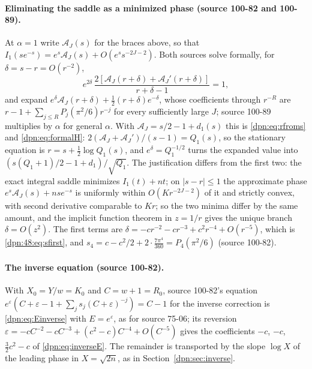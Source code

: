 \documentclass[11pt]{article}
\numberwithin{equation}{section}
\theoremstyle{definition}\newtheorem{definition}[theorem]{Definition}
\theoremstyle{remark}\newtheorem{remark}[theorem]{Remark}
\newcommand{\src}[1]{\textup{(source #1)}}
\begin{document}
\paragraph{Eliminating the saddle as a minimized phase \src{100-82 and 100-89}.}
At $\alpha=1$ write $\mathcal A_J(s)$ for the braces above, so that
$I_1(se^{-s})=e^s\mathcal A_J(s)+O(e^ss^{-2J-2})$.  Both sources solve
formally, for $\delta=s-r=O(r^{-2})$,
\[
 e^{2\delta}\,\frac{2[\mathcal A_J(r+\delta)+\mathcal A_J'(r+\delta)]}{r+\delta-1}=1,
\]
and expand $e^\delta\mathcal A_J(r+\delta)+\frac12(r+\delta)e^{-\delta}$, whose
coefficients through $r^{-R}$ are $r-1+\sum_{j\le R}P_j(\pi^2/6)r^{-j}$ for
every sufficiently large $J$; source 100-89 multiplies by $\alpha$ for general
$\alpha$.  With $\mathcal A_J=s/2-1+d_1(s)$ this is \eqref{dpn:eq:rfroms} and
\eqref{dpn:eq:formalH}: $2(\mathcal A_J+\mathcal A_J')/(s-1)=Q_1(s)$, so the
stationary equation is $r=s+\frac12\log Q_1(s)$, and $e^{\delta}=Q_1^{-1/2}$
turns the expanded value into $(s(Q_1+1)/2-1+d_1)/\sqrt{Q_1}$.  The
justification differs from the first two: the exact integral saddle
minimizes $I_1(t)+nt$; on $|s-r|\le1$ the approximate phase
$e^s\mathcal A_J(s)+nse^{-s}$ is uniformly within $O(Kr^{-2J-2})$ of it and
strictly convex, with second derivative comparable to $Kr$; so the two minima
differ by the same amount, and the implicit function theorem in $z=1/r$
gives the unique branch $\delta=O(z^2)$.  The first terms are
$\delta=-cr^{-2}-cr^{-3}+c^2r^{-4}+O(r^{-5})$, which is \eqref{dpn:48:eq:sfirst},
and $s_4=c-c^2/2+2\cdot\frac{7\pi^4}{360}=P_4(\pi^2/6)$ \src{100-82}.

\paragraph{The inverse equation \src{100-82}.}
With $X_0=Y/w=K_0$ and $C=w+1=R_0$, source 100-82's equation
$e^{\varepsilon}(C+\varepsilon-1+\sum_js_j(C+\varepsilon)^{-j})=C-1$ for the
inverse correction is \eqref{dpn:eq:Einverse} with $E=e^\varepsilon$, as for
source 75-06; its reversion $\varepsilon=-cC^{-2}-cC^{-3}+(c^2-c)C^{-4}+O(C^{-5})$
gives the coefficients $-c$, $-c$, $\frac32c^2-c$ of \eqref{dpn:eq:inverseE}.
The remainder is transported by the slope $\log X$ of the leading phase in
$X=\sqrt{2n}$, as in Section~\ref{dpn:sec:inverse}.

\end{document}
